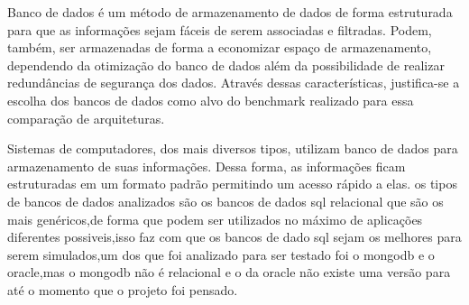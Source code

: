 \documentclass[
	12pt,				%
	openright,			%
	oneside,			%
	a4paper,			%
	english,			%
	french,				%
	spanish,			%
	brazil,				%
	]{abntex2}
\begin{document}
Banco de dados é um método de armazenamento de dados de forma estruturada para que as informações sejam fáceis de serem associadas e filtradas. Podem, também, ser armazenadas de forma a economizar espaço de armazenamento, dependendo da otimização do banco de dados além da possibilidade de realizar redundâncias de segurança dos dados. Através dessas características, justifica-se a escolha dos bancos de dados como alvo do benchmark realizado para essa comparação de arquiteturas.

Sistemas de computadores, dos mais diversos tipos, utilizam banco de dados para armazenamento de suas informações. Dessa forma, as informações ficam estruturadas em um formato padrão permitindo um acesso rápido a elas.
os tipos de bancos de dados analizados são os bancos de dados sql relacional que são os mais genéricos,de forma que podem ser utilizados no máximo de aplicações diferentes possiveis,isso faz com que os bancos de dado sql sejam os melhores para serem simulados,um dos que foi analizado para ser testado foi o mongodb e o oracle,mas o mongodb não é relacional e o da oracle não existe uma versão para  até o momento que o projeto foi pensado.
\end{document}
